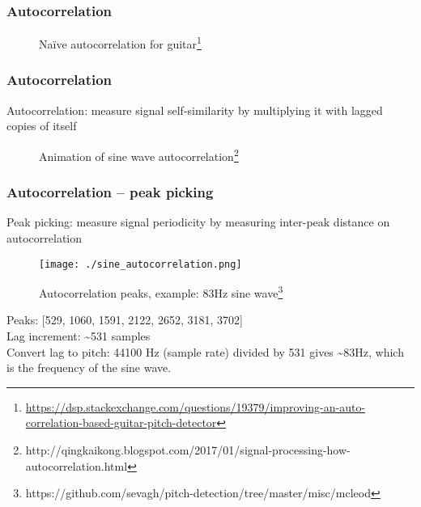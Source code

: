 \documentclass{beamer}
\begin{document}

\begin{frame}
	\frametitle{Autocorrelation}
	\begin{figure}
		\hspace{0.1em}
		\caption{Na{\"i}ve autocorrelation for guitar\footnote{\href{https://dsp.stackexchange.com/questions/19379/improving-an-auto-correlation-based-guitar-pitch-detector}{https://dsp.stackexchange.com/questions/19379/improving-an-auto-correlation-based-guitar-pitch-detector}}}
	\end{figure}
\end{frame}

\begin{frame}
	\frametitle{Autocorrelation}
	Autocorrelation: measure signal self-similarity by multiplying it with lagged copies of itself
	\begin{figure}
		\caption{Animation of sine wave autocorrelation\footnote{http://qingkaikong.blogspot.com/2017/01/signal-processing-how-autocorrelation.html}}
		\vspace{-1em}
	\end{figure}
\end{frame}


\begin{frame}
	\frametitle{Autocorrelation -- peak picking}
	Peak picking: measure signal periodicity by measuring inter-peak distance on autocorrelation
	\begin{figure}
		\texttt{[image: ./sine\_autocorrelation.png]}
		\caption{Autocorrelation peaks, example: 83Hz sine wave\footnote{https://github.com/sevagh/pitch-detection/tree/master/misc/mcleod}}
	\vspace{-1em}
	\end{figure}
	Peaks: [529, 1060, 1591, 2122, 2652, 3181, 3702]\\
	Lag increment: \textasciitilde531 samples\\
	Convert lag to pitch: 44100 Hz (sample rate) divided by 531 gives \textasciitilde83Hz, which is the frequency of the sine wave.
\end{frame}
\end{document}
